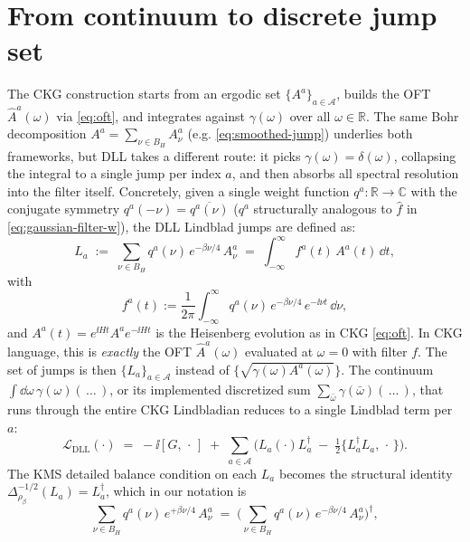 \section{From continuum to discrete jump set} The CKG construction starts from an ergodic set $\{A^a\}_{a\in\mathcal{A}}$, builds the OFT $\hat{A}^a(\omega)$ via \eqref{eq:oft}, and integrates against $\gamma(\omega)$ over all $\omega \in \mathbb{R}$. The same Bohr decomposition
$A^a = \sum_{\nu\in B_H} A^a_\nu$ (e.g. \eqref{eq:smoothed-jump}) underlies both frameworks, but DLL takes a different route: it picks $\gamma(\omega) = \delta(\omega)$, collapsing the integral to a single jump per index $a$, and then absorbs all spectral resolution into the filter itself. Concretely, given a single weight function $q^a:\mathbb{R}\to\mathbb{C}$ with the conjugate symmetry $q^a(-\nu) = \overline{q^a(\nu)}$ ($q^a$ structurally analogous to $\hat{f}$ in \eqref{eq:gaussian-filter-w}), the DLL Lindblad jumps are defined as:
\begin{equation} \label{eq:dll-jump}
    L_a \;:=\; \sum_{\nu \in B_H} q^a(\nu)\, e^{-\beta\nu/4}\, A^a_\nu
    \;=\; \int_{-\infty}^{\infty} f^a(t)\, A^a(t)\, \dd t,
\end{equation}
with 
$$
f^a(t) := \frac{1}{2\pi}\int_{-\infty}^{\infty} q^a(\nu)\, e^{-\beta\nu/4}\, e^{-\ii\nu t}\, \dd\nu,
$$
and $A^a(t) = e^{\ii H t} A^a e^{-\ii H t}$ is the Heisenberg evolution as in CKG \eqref{eq:oft}. In CKG language, this is \emph{exactly} the OFT $\hat{A}^a(\omega)$ evaluated at $\omega = 0$ with filter $f$. The set of jumps is then $\{L_a\}_{a\in\mathcal{A}}$ instead of $\{\sqrt{\gamma(\omega) A^a(\omega)}\}$. The continuum $\int \dd\omega\, \gamma(\omega)(\,\dots\,)$, or its implemented discretized sum $\sum_{\bar{\omega}} \gamma(\bar{\omega})(\,\dots\,)$, that runs through the entire CKG Lindbladian reduces to a single Lindblad term per $a$:
\begin{equation} \label{eq:dll-L}
    \mathcal{L}_\text{DLL}(\cdot) \;=\; -\ii[G,\,\cdot\,] \;+\; \sum_{a\in\mathcal{A}}\Big( L_a (\cdot) L_a^\dagger \;-\; \tfrac{1}{2}\{L_a^\dagger L_a,\,\cdot\,\}\Big).
\end{equation}
The KMS detailed balance condition on each $L_a$ becomes the structural identity $\Delta_{\rho_\beta}^{-1/2}(L_a) = L_a^\dagger$, which in our notation is 
\begin{equation} \label{eq:dll-jump-self-adjoint}
    \sum_{\nu \in B_H} q^a(\nu)\, e^{+\beta\nu/4}\, A^a_\nu \;=\; \Big(\sum_{\nu\in B_H} q^a(\nu)\, e^{-\beta\nu/4}\, A^a_\nu\Big)^\dagger,
\end{equation}
